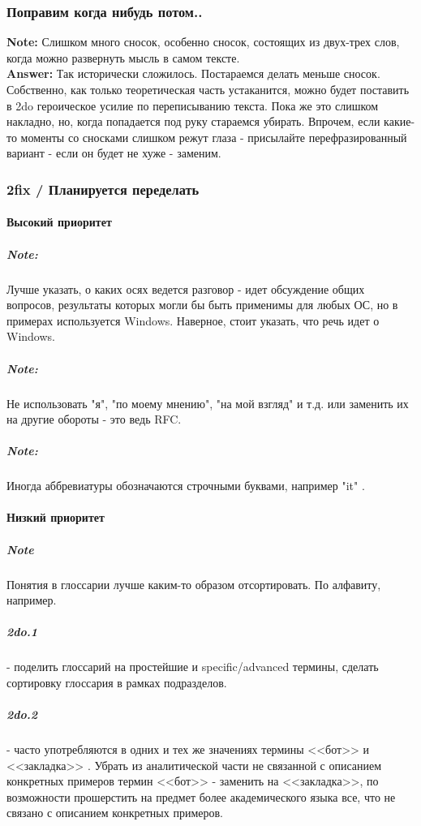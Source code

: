 \subsubsection{Поправим когда нибудь потом..}

{\bf Note:}   Слишком много сносок, особенно сносок, состоящих из двух-трех слов, когда можно развернуть мысль в самом тексте.\\
{\bf Answer:} Так исторически сложилось. Постараемся делать меньше сносок. Собственно, как только теоретическая часть устаканится, можно будет поставить в 2do героическое усилие по переписыванию текста. Пока же это слишком накладно, но, когда попадается под руку стараемся убирать.
 Впрочем, если какие-то моменты со сносками слишком режут глаза - присылайте перефразированный вариант - если он будет не хуже - заменим.

\subsubsection{2fix / Планируется переделать}
\label{paper_2do_1}

\paragraph{Высокий приоритет\\}

\subparagraph{Note:} Лучше указать, о каких осях ведется разговор - идет обсуждение общих вопросов,
результаты которых могли бы быть применимы для любых ОС, но в примерах используется
Windows. Наверное, стоит указать, что речь идет о Windows.
\subparagraph{Note:} Не использовать "я", "по моему мнению", "на мой взгляд" и т.д. или заменить их на другие обороты - это ведь RFC.
\subparagraph{Note:} Иногда аббревиатуры обозначаются строчными буквами, например "it" .

\paragraph{Низкий приоритет\\}

\subparagraph{Note} Понятия в глоссарии лучше каким-то образом отсортировать. По алфавиту, например.
\subparagraph{2do.1} - поделить глоссарий на простейшие и specific/advanced термины, сделать сортировку глоссария в рамках подразделов.
\subparagraph{2do.2} - часто употребляются в одних и тех же значениях термины <<бот>> и <<закладка>> . Убрать из аналитической части не связанной с описанием конкретных примеров термин <<бот>> - заменить на <<закладка>>, по возможности прошерстить на предмет более академического языка все, что не связано с описанием конкретных примеров.

